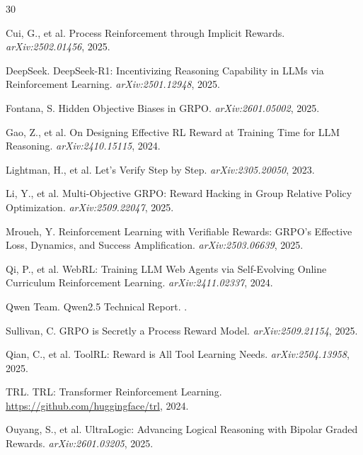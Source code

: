 \documentclass[11pt]{article}
\begin{document}
\begin{thebibliography}{30}

Cui, G., et al.
\newblock Process Reinforcement through Implicit Rewards.
\newblock \emph{arXiv:2502.01456}, 2025.

DeepSeek.
\newblock DeepSeek-R1: Incentivizing Reasoning Capability in LLMs via Reinforcement Learning.
\newblock \emph{arXiv:2501.12948}, 2025.

Fontana, S.
\newblock Hidden Objective Biases in GRPO.
\newblock \emph{arXiv:2601.05002}, 2025.

Gao, Z., et al.
\newblock On Designing Effective RL Reward at Training Time for LLM Reasoning.
\newblock \emph{arXiv:2410.15115}, 2024.

Lightman, H., et al.
\newblock Let's Verify Step by Step.
\newblock \emph{arXiv:2305.20050}, 2023.


Li, Y., et al.
\newblock Multi-Objective GRPO: Reward Hacking in Group Relative Policy Optimization.
\newblock \emph{arXiv:2509.22047}, 2025.

Mroueh, Y.
\newblock Reinforcement Learning with Verifiable Rewards: GRPO's Effective Loss, Dynamics, and Success Amplification.
\newblock \emph{arXiv:2503.06639}, 2025.

Qi, P., et al.
\newblock WebRL: Training LLM Web Agents via Self-Evolving Online Curriculum Reinforcement Learning.
\newblock \emph{arXiv:2411.02337}, 2024.

Qwen Team.
\newblock Qwen2.5 Technical Report.
.

Sullivan, C.
\newblock GRPO is Secretly a Process Reward Model.
\newblock \emph{arXiv:2509.21154}, 2025.

Qian, C., et al.
\newblock ToolRL: Reward is All Tool Learning Needs.
\newblock \emph{arXiv:2504.13958}, 2025.

TRL.
\newblock TRL: Transformer Reinforcement Learning.
\newblock \url{https://github.com/huggingface/trl}, 2024.

Ouyang, S., et al.
\newblock UltraLogic: Advancing Logical Reasoning with Bipolar Graded Rewards.
\newblock \emph{arXiv:2601.03205}, 2025.


\end{thebibliography}
\end{document}
